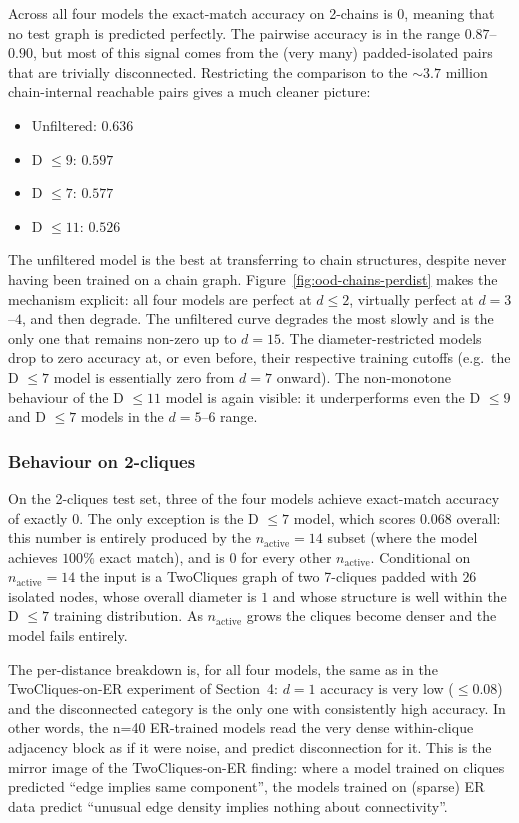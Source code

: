 \documentclass[11pt,a4paper]{article}
\begin{document}
Across all four models the exact-match accuracy on 2-chains is \(0\), meaning that no test graph is predicted perfectly. 
The pairwise accuracy is in the range \(0.87\)--\(0.90\), but most of this signal comes from the (very many) padded-isolated 
pairs that are trivially disconnected. Restricting the comparison to the \(\sim 3.7\) million chain-internal reachable pairs 
gives a much cleaner picture:
\begin{itemize}
    \item Unfiltered: \(0.636\)
    \item D \(\le 9\): \(0.597\)
    \item D \(\le 7\): \(0.577\)
    \item D \(\le 11\): \(0.526\)
\end{itemize}
The unfiltered model is the best at transferring to chain structures, despite never having been trained on a chain graph. 
Figure~\ref{fig:ood-chains-perdist} makes the mechanism explicit: all four models are perfect at \(d \le 2\), virtually 
perfect at \(d = 3\)--\(4\), and then degrade. The unfiltered curve degrades the most slowly and is the only one that 
remains non-zero up to \(d = 15\). The diameter-restricted models drop to zero accuracy at, or even before, their 
respective training cutoffs (e.g.\ the D \(\le 7\) model is essentially zero from \(d = 7\) onward). The non-monotone 
behaviour of the D \(\le 11\) model is again visible: it underperforms even the D \(\le 9\) and D \(\le 7\) models in 
the \(d = 5\)--\(6\) range.

\subsubsection*{Behaviour on 2-cliques}

On the 2-cliques test set, three of the four models achieve exact-match accuracy of exactly \(0\). The only exception 
is the D \(\le 7\) model, which scores \(0.068\) overall: this number is entirely produced by the \(n_{\text{active}} = 14\) 
subset (where the model achieves \(100\%\) exact match), and is \(0\) for every other \(n_{\text{active}}\). Conditional on 
\(n_{\text{active}} = 14\) the input is a TwoCliques graph of two 7-cliques padded with \(26\) isolated nodes, whose overall 
diameter is \(1\) and whose structure is well within the D \(\le 7\) training distribution. As \(n_{\text{active}}\) grows 
the cliques become denser and the model fails entirely.

The per-distance breakdown is, for all four models, the same as in the TwoCliques-on-ER experiment of Section~4: \(d = 1\) 
accuracy is very low (\(\leq 0.08\)) and the disconnected category is the only one with consistently high accuracy. 
In other words, the n=40 ER-trained models read the very dense within-clique adjacency block as if it were noise, and 
predict disconnection for it. This is the mirror image of the TwoCliques-on-ER finding: where a model trained on cliques 
predicted ``edge implies same component'', the models trained on (sparse) ER data predict ``unusual edge density implies 
nothing about connectivity''.
\end{document}
